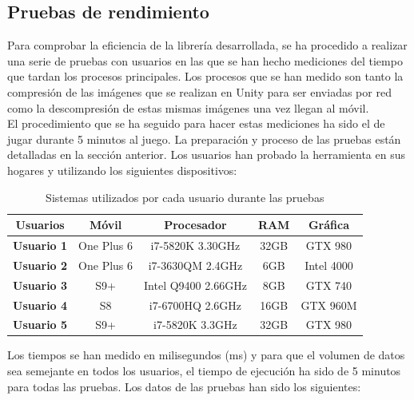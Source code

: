 \subsection{Pruebas de rendimiento}

Para comprobar la eficiencia de la librer\'ia desarrollada, se ha procedido a realizar una serie de pruebas con usuarios en las que se han hecho mediciones del tiempo que tardan los procesos principales. Los procesos que se han medido son tanto la compresi\'on de las im\'agenes que se realizan en Unity para ser enviadas por red como la descompresi\'on de estas mismas im\'agenes una vez llegan al m\'ovil.\\

El procedimiento que se ha seguido para hacer estas mediciones ha sido el de jugar durante 5 minutos al juego. La preparaci\'on y proceso de las pruebas est\'an detalladas en la secci\'on anterior. Los usuarios han probado la herramienta en sus hogares y utilizando los siguientes dispositivos:

\begin{table}[h]
    \begin{tabular}{ccccc}
        \toprule
         \textbf{Usuarios} & \textbf{M\'ovil} & \textbf{Procesador} & \textbf{RAM} & \textbf{Gr\'afica} \\
        \midrule
\textbf{Usuario 1} & One Plus 6 & i7-5820K 3.30GHz & 32GB &  GTX 980\\
\textbf{Usuario 2} & One Plus 6 & i7-3630QM 2.4GHz & 6GB &  Intel 4000 \\
\textbf{Usuario 3} & S9+ & Intel Q9400 2.66GHz & 8GB &  GTX 740 \\
\textbf{Usuario 4} & S8 & i7-6700HQ 2.6GHz & 16GB & GTX 960M \\
\textbf{Usuario 5} & S9+ & i7-5820K 3.3GHz & 32GB &  GTX 980 \\
        \bottomrule
    \end{tabular}
\caption{Sistemas utilizados por cada usuario durante las pruebas}
\label{tablausuarios}
\end{table}

Los tiempos se han medido en milisegundos (ms) y para que el volumen de datos sea semejante en todos los usuarios, el tiempo de ejecuci\'on ha sido de 5 minutos para todas las pruebas. Los datos de las pruebas han sido los siguientes:

